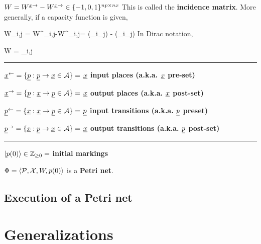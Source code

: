 $W =W^{{\underline{x}} \rightarrow}-W^{{\underline{x}} \rightarrow}\in \{-1, 0, 1\}^{np\times nx}$ This is called the {\bf incidence matrix}.
More generally, if a capacity function is given, 

\beq
W_{i,j} =
 W^{\rvx \rarrow}_{i,j}-W^{\rvx \larrow}_{i,j}=
\kappa(\rvp_i\rarrow \rvx_j)
-
\kappa(\rvp_i\larrow \rvx_j)
\eeq
In Dirac notation, 

\beq
W =  \sum_{i,j}
\eeq

\hrule
${\underline{x}}^\leftarrow = \{{\underline{p}} : {\underline{p}} \rightarrow {\underline{x}}\in{\cal A}\}=$ {\bf ${\underline{x}}$ input places (a.k.a. ${\underline{x}}$ pre-set)}

${\underline{x}}^\rightarrow = \{{\underline{p}} : {\underline{x}} \rightarrow {\underline{p}} \in {\cal A}\}=$ {\bf ${\underline{x}}$ output places (a.k.a. ${\underline{x}}$ post-set)}

${\underline{p}}^\leftarrow = \{{\underline{x}} : {\underline{x}} \rightarrow {\underline{p}} \in {\cal A} \}=$ {\bf${\underline{p}}$ input transitions (a.k.a. ${\underline{p}}$ preset)}

${\underline{p}}^\rightarrow = \{{\underline{x}} : {\underline{p}} \rightarrow{\underline{x}} \in{\cal A}\}=$ {\bf ${\underline{x}}$ output transitions (a.k.a. ${\underline{p}}$ post-set)}

\hrule
$|p(0)\rangle\in {\mathbb{Z}}_{\geq 0} =$ {\bf initial markings}

$\Phi = \left\langle{\cal P}, {\cal X},W, p(0)\right\rangle$ is a {\bf Petri net}.
\subsection{Execution of a Petri net}
\section{Generalizations}
